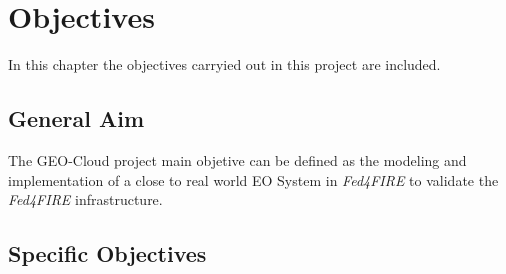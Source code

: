 \chapter{Objectives}
\label{chap:objetivos}
In this chapter the objectives carryied out in this project are included.

\section{General Aim}

The GEO-Cloud project main objetive can be defined as the modeling and
implementation of a close to real world \ac{EO} System in \emph{Fed4FIRE} to validate the \emph{Fed4FIRE} infrastructure.

\section{Specific Objectives}

